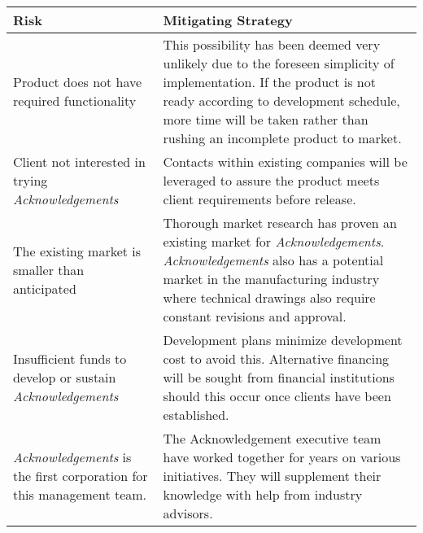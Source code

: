 \begin{center} \begin{tabular}{| p{2in} | p{4in} | }
    \hline
    {\bf Risk} & {\bf Mitigating Strategy} \\ \hline
	
	{Product does not have required functionality} & 
	{This possibility has been deemed very unlikely due to the foreseen simplicity of implementation. If the product is not ready according to development schedule, more time will be taken rather than rushing an incomplete product to market.} \\ \hline
	
	{\raggedright Client not interested in trying {\it Acknowledgements}} & 
	{Contacts within existing companies will be leveraged to assure the product meets client requirements before release.} \\ \hline
	
	{The existing market is smaller than anticipated} & 
	{Thorough market research has proven an existing market for {\it Acknowledgements}. {\it Acknowledgements} also has a potential market in the manufacturing industry where technical drawings also require constant revisions and approval.} \\ \hline
	
	{Insufficient funds to develop or sustain {\it Acknowledgements}} & 
	{Development plans minimize development cost to avoid this. Alternative financing will be sought from financial institutions should this occur once clients have been established.} \\ \hline

	{{\it Acknowledgements} is the first corporation for this management team.} & 
	{The Acknowledgement executive team have worked together for years on various initiatives. They will supplement their knowledge with help from industry advisors.} \\ \hline
\end{tabular} \end{center}